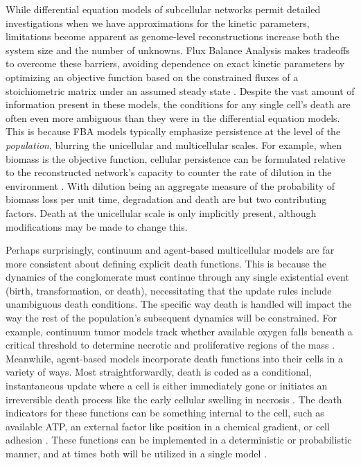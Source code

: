 \documentclass{article}
\begin{document}
While differential equation models of subcellular networks permit detailed investigations when we have approximations for the kinetic parameters, limitations become apparent as genome-level reconstructions increase both the system size and the number of unknowns. Flux Balance Analysis makes tradeoffs to overcome these barriers, avoiding dependence on exact kinetic parameters by optimizing an objective function based on the constrained fluxes of a stoichiometric matrix under an assumed steady state \cite{orth_what_2010}. Despite the vast amount of information present in these models, the conditions for any single cell’s death are often even more ambiguous than they were in the differential equation models. This is because FBA models typically emphasize persistence at the level of the \textit{population}, blurring the unicellular and multicellular scales. For example, when biomass is the objective function, cellular persistence can be formulated relative to the reconstructed network’s capacity to counter the rate of dilution in the environment \cite{regimbeau_contribution_2022}. With dilution being an aggregate measure of the probability of biomass loss per unit time, degradation and death are but two contributing factors. Death at the unicellular scale is only implicitly present, although modifications may be made to change this.

Perhaps surprisingly, continuum and agent-based multicellular models are far more consistent about defining explicit death functions. This is because the dynamics of the conglomerate must continue through any single existential event (birth, transformation, or death), necessitating that the update rules include unambiguous death conditions. The specific way death is handled will impact the way the rest of the population’s subsequent dynamics will be constrained. For example, continuum tumor models track whether available oxygen falls beneath a critical threshold to determine necrotic and proliferative regions of the mass \cite{lowengrub_nonlinear_2010, gefen_modeling_2013}. Meanwhile, agent-based models incorporate death functions into their cells in a variety of ways. Most straightforwardly, death is coded as a conditional, instantaneous update where a cell is either immediately gone or initiates an irreversible death process like the early cellular swelling in necrosis \cite{ghaffarizadeh_physicell_2018}. The death indicators for these functions can be something internal to the cell, such as available ATP, an external factor like position in a chemical gradient, or cell adhesion \cite{gatenby_cellular_2007,smallbone_metabolic_2007,anderson_microenvironment_2009}. These functions can be implemented in a deterministic or probabilistic manner, and at times both will be utilized in a single model \cite{gatenby_cellular_2007,smallbone_metabolic_2007,anderson_microenvironment_2009,ghaffarizadeh_physicell_2018}.
\end{document}
